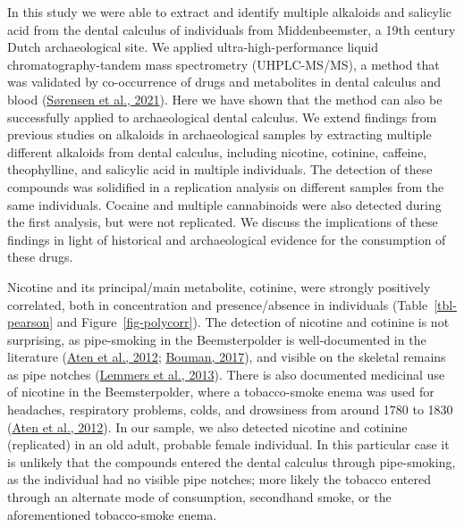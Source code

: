 \documentclass[
  letterpaper,
]{book}
\begin{document}
In this study we were able to extract and identify multiple alkaloids
and salicylic acid from the dental calculus of individuals from
Middenbeemster, a 19th century Dutch archaeological site. We applied
ultra-high-performance liquid chromatography-tandem mass spectrometry
(UHPLC-MS/MS), a method that was validated by co-occurrence of drugs and
metabolites in dental calculus and blood
(\protect\hyperlink{ref-sorensenDrugsCalculus2021}{Sørensen et al.,
2021}). Here we have shown that the method can also be successfully
applied to archaeological dental calculus. We extend findings from
previous studies on alkaloids in archaeological samples by extracting
multiple different alkaloids from dental calculus, including nicotine,
cotinine, caffeine, theophylline, and salicylic acid in multiple
individuals. The detection of these compounds was solidified in a
replication analysis on different samples from the same individuals.
Cocaine and multiple cannabinoids were also detected during the first
analysis, but were not replicated. We discuss the implications of these
findings in light of historical and archaeological evidence for the
consumption of these drugs.

Nicotine and its principal/main metabolite, cotinine, were strongly
positively correlated, both in concentration and presence/absence in
individuals (Table~\ref{tbl-pearson} and Figure~\ref{fig-polycorr}). The
detection of nicotine and cotinine is not surprising, as pipe-smoking in
the Beemsterpolder is well-documented in the literature
(\protect\hyperlink{ref-aten400Jaar2012}{Aten et al., 2012};
\protect\hyperlink{ref-boumanBegravenis2017}{Bouman, 2017}), and visible
on the skeletal remains as pipe notches
(\protect\hyperlink{ref-lemmersMiddenbeemster2013}{Lemmers et al.,
2013}). There is also documented medicinal use of nicotine in the
Beemsterpolder, where a tobacco-smoke enema was used for headaches,
respiratory problems, colds, and drowsiness from around 1780 to 1830
(\protect\hyperlink{ref-aten400Jaar2012}{Aten et al., 2012}). In our
sample, we also detected nicotine and cotinine (replicated) in an old
adult, probable female individual. In this particular case it is
unlikely that the compounds entered the dental calculus through
pipe-smoking, as the individual had no visible pipe notches; more likely
the tobacco entered through an alternate mode of consumption, secondhand
smoke, or the aforementioned tobacco-smoke enema.
\end{document}
